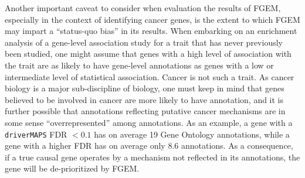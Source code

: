 Another important caveat to consider when evaluation the results of FGEM, especially in the context of identifying cancer genes, is the extent to which FGEM may impart a ``status-quo bias'' in its results. When embarking on an enrichment analysis of a gene-level association study for a trait that has never previously been studied, one might assume that genes with a high level of association with the trait are as likely to have gene-level annotations as genes with a low or intermediate level of statistical association.  Cancer is not such a trait.  As cancer biology is a major sub-discipline of biology, one must keep in mind that genes believed to be involved in cancer are more likely to have annotation, and it is further possible that annotations reflecting putative cancer mechanisms are in some sense ``overrepresented'' among annotations.  As an example, a gene with a \texttt{driverMAPS} FDR $\lt 0.1$ has on average 19 Gene Ontology annotations, while a gene with a higher FDR has on average only 8.6 annotations.  As a consequence, if a true causal gene operates by a mechanism not reflected in its annotations, the gene will be de-prioritized by FGEM.
